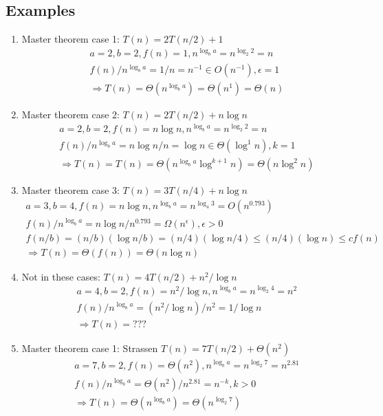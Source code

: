 \documentclass[a4paper]{article}
\theoremstyle{plain}
\begin{document}
\subsection*{Examples}
\begin{enumerate}
    \item Master theorem case 1: $T(n) = 2T(n/2) + 1$
    \begin{align*}
        a=2, b=2, f(n)=1,n^{\log_b{a}}=n^{\log_2{2}}=n\\
 f(n)/{n^{\log_b{a}}}=1/n=n^{-1}\in O(n^{-1}), \epsilon=1\\
 \Rightarrow T(n)=\Theta(n^{\log_b{a}})=\Theta(n^1)=\Theta(n)
    \end{align*}
    \item Master theorem case 2: $T(n) = 2T(n/2) + n\log{n}$
    \begin{align*}
        a=2, b=2, f(n)=n\log{n},n^{\log_b{a}}=n^{\log_2{2}}=n\\
 f(n)/{n^{\log_b{a}}}={n\log{n}}/n=\log{n}\in \Theta({\log^1{n}}), k=1\\
 \Rightarrow T(n)=T(n)=\Theta(n^{\log_b{a}} {\log^{k+1}{n}})=\Theta(n {\log^{2}{n}})
    \end{align*}
    \item Master theorem case 3: $T(n) = 3T(n/4) + n\log{n}$
    \begin{gather*}
        a=3, b=4, f(n)=n\log{n},n^{\log_b{a}}=n^{\log_4{3}}=O(n^{0.793})\\
        f(n)/{n^{\log_b{a}}}={n\log{n}}/{n^{0.793}}=\Omega(n^{\epsilon}),\epsilon>0\\
        f(n/b)=(n/b)(\log{n/b})=(n/4)(\log{n/4})\leq (n/4)(\log{n})\leq cf(n)\\
        \Rightarrow T(n)=\Theta(f(n))=\Theta(n\log{n})
    \end{gather*}
    \item Not in these cases: $T(n) = 4T(n/2) + n^2/{\log n}$
    \begin{gather*}
        a=4, b=2, f(n)=n^2/{\log n},n^{\log_b{a}}=n^{\log_2{4}}=n^2\\
 f(n)/{n^{\log_b{a}}}=(n^2/{\log n})/{n^2}=1/\log{n}\\
 \Rightarrow T(n)=???
    \end{gather*}
    \item Master theorem case 1: Strassen $T(n) = 7T(n/2) + \Theta(n^2)$
    \begin{gather*}
        a=7, b=2, f(n)=\Theta(n^2),n^{\log_b{a}}=n^{\log_2{7}}=n^{2.81}\\
        f(n)/{n^{\log_b{a}}}={\Theta(n^2)}/{n^{2.81}}=n^{-k}, k>0\\
        \Rightarrow T(n)=\Theta(n^{\log_b{a}})=\Theta(n^{\log_2{7}})
    \end{gather*}
\end{enumerate}
\end{document}
